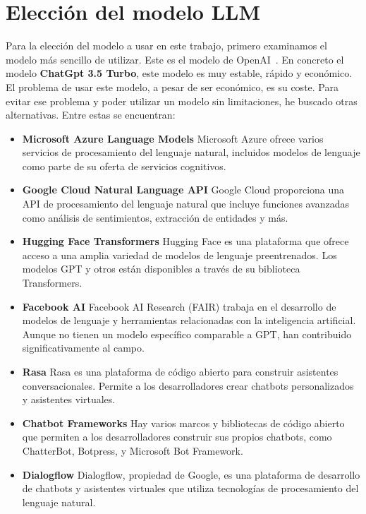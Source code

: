 \section{Elección del modelo LLM}

Para la elección del modelo a usar en este trabajo, primero examinamos el modelo más sencillo de utilizar.
Este es el modelo de OpenAI~\cite{chatgpt1}. En concreto el modelo \textbf{ChatGpt 3.5 Turbo}, este modelo es muy estable, rápido y económico.
El problema de usar este modelo, a pesar de ser económico, es su coste.
Para evitar ese problema y poder utilizar un modelo sin limitaciones, he buscado otras alternativas.
Entre estas se encuentran:
\begin{itemize}
   \item \textbf{Microsoft Azure Language Models} Microsoft Azure ofrece varios servicios de procesamiento del lenguaje natural, incluidos modelos de lenguaje como parte de su oferta de servicios cognitivos.
   \item \textbf{Google Cloud Natural Language API} Google Cloud proporciona una API de procesamiento del lenguaje natural que incluye funciones avanzadas como análisis de sentimientos, extracción de entidades y más.
   \item \textbf{Hugging Face Transformers} Hugging Face es una plataforma que ofrece acceso a una amplia variedad de modelos de lenguaje preentrenados. Los modelos GPT y otros están disponibles a través de su biblioteca Transformers.
   \item \textbf{Facebook AI} Facebook AI Research (FAIR) trabaja en el desarrollo de modelos de lenguaje y herramientas relacionadas con la inteligencia artificial. Aunque no tienen un modelo específico comparable a GPT, han contribuido significativamente al campo.
   \item \textbf{Rasa} Rasa es una plataforma de código abierto para construir asistentes conversacionales. Permite a los desarrolladores crear chatbots personalizados y asistentes virtuales.
   \item \textbf{Chatbot Frameworks} Hay varios marcos y bibliotecas de código abierto que permiten a los desarrolladores construir sus propios chatbots, como ChatterBot, Botpress, y Microsoft Bot Framework.
   \item \textbf{Dialogflow} Dialogflow, propiedad de Google, es una plataforma de desarrollo de chatbots y asistentes virtuales que utiliza tecnologías de procesamiento del lenguaje natural.
\end{itemize}

